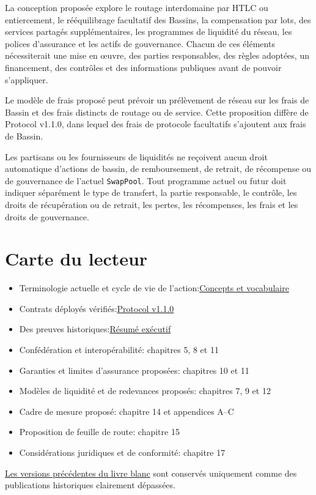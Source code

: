 \documentclass[11pt]{article}
\begin{document}
La conception proposée explore le routage interdomaine par HTLC ou entiercement, le rééquilibrage facultatif des Bassins, la compensation par lots, des services partagés supplémentaires, les programmes de liquidité du réseau, les polices d'assurance et les actifs de gouvernance. Chacun de ces éléments nécessiterait une mise en œuvre, des parties responsables, des règles adoptées, un financement, des contrôles et des informations publiques avant de pouvoir s'appliquer.

Le modèle de frais proposé peut prévoir un prélèvement de réseau sur les frais de Bassin et des frais distincts de routage ou de service. Cette proposition diffère de Protocol v1.1.0, dans lequel des frais de protocole facultatifs s'ajoutent aux frais de Bassin.

Les partisans ou les fournisseurs de liquidités ne reçoivent aucun droit automatique d'actions de bassin, de remboursement, de retrait, de récompense ou de gouvernance de l'actuel \texttt{SwapPool}. Tout programme actuel ou futur doit indiquer séparément le type de transfert, la partie responsable, le contrôle, les droits de récupération ou de retrait, les pertes, les récompenses, les frais et les droits de gouvernance.

\section*{Carte du lecteur}

\begin{itemize}[leftmargin=*]
\item Terminologie actuelle et cycle de vie de l'action:\href{https://docs.cosmolocal.credit/fr/introduction/concepts}{Concepts et vocabulaire}
\item Contrats déployés vérifiés:\href{https://docs.cosmolocal.credit/fr/protocol/overview}{Protocol v1.1.0}
\item Des preuves historiques:\href{https://docs.cosmolocal.credit/fr/white-paper/executive-summary}{Résumé exécutif}
\item Confédération et interopérabilité: chapitres 5, 8 et 11
\item Garanties et limites d'assurance proposées: chapitres 10 et 11
\item Modèles de liquidité et de redevances proposés: chapitres 7, 9 et 12
\item Cadre de mesure proposé: chapitre 14 et appendices A--C
\item Proposition de feuille de route: chapitre 15
\item Considérations juridiques et de conformité: chapitre 17
\end{itemize}
\href{https://docs.cosmolocal.credit/fr/white-paper/archive}{Les versions précédentes du livre blanc} sont conservés uniquement comme des publications historiques clairement dépassées.
\end{document}
